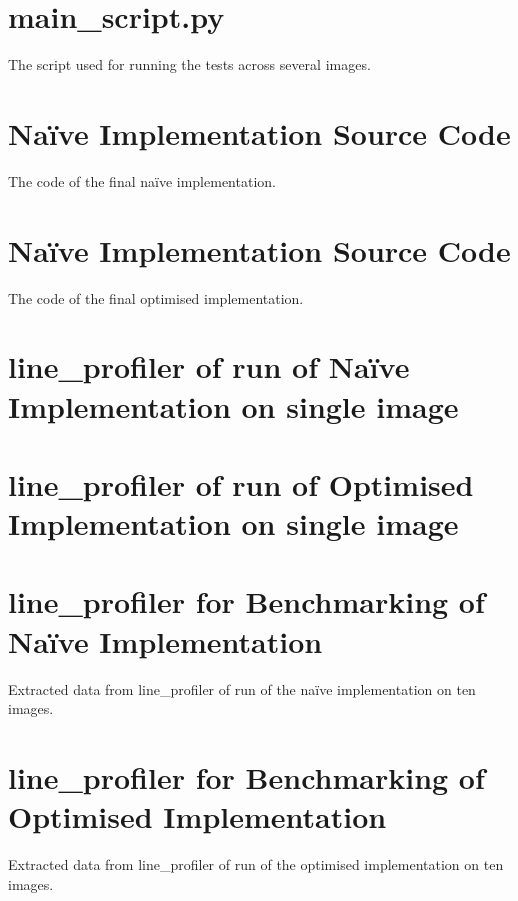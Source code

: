 \chapter{main_script.py}
\label{AppMain} 

The script used for running the tests across several images. 




\chapter{Na\"ive Implementation Source Code}
\label{AppNaive} 

The code of the final na\"ive implementation. 



\chapter{Na\"ive Implementation Source Code}
\label{AppOpt} 

The code of the final optimised implementation. 








\begin{landscape}

\chapter{line_profiler of run of Na\"ive Implementation on single image}
\label{AppLinePS1}



\chapter{line_profiler of run of Optimised Implementation on single image}
\label{AppLinePS2}









\chapter{line_profiler for Benchmarking of Na\"ive Implementation}
\label{AppLinePS110}
Extracted data from line_profiler of run of the na\"ive implementation on ten images.



\chapter{line_profiler for Benchmarking of Optimised Implementation}
\label{AppLinePS210}
Extracted data from line_profiler of run of the optimised implementation on ten images.



\end{landscape}